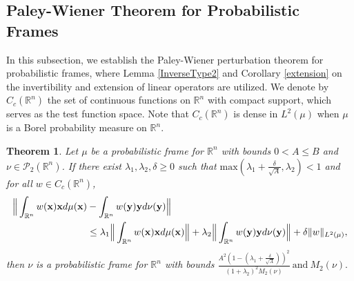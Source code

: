 \documentclass{amsart}
\numberwithin{equation}{section}
\theoremstyle{plain}
\newtheorem{theorem}{Theorem}[section]
\theoremstyle{definition}
\begin{document}
\subsection{Paley-Wiener Theorem for Probabilistic Frames}\label{PaleyWiener}
In this subsection, we establish the Paley-Wiener perturbation theorem for probabilistic frames, where Lemma \ref{InverseType2} and Corollary \ref{extension} on the invertibility and extension of linear operators are utilized. We denote by $C_c(\mathbb{R}^n)$ the set of continuous functions on $\mathbb{R}^n$ with compact support, which serves as the test function space. Note that $C_c(\mathbb{R}^n)$ is dense in $L^2(\mu)$ when $\mu$ is a Borel probability measure on $\mathbb{R}^n$. 


\begin{theorem}\label{PaleyPFrame2}
Let $\mu$ be a probabilistic frame for $\mathbb{R}^n$ with bounds $0<A\leq B$ and $\nu \in \mathcal{P}_2(\mathbb{R}^n)$. If there exist  $\lambda_1,\lambda_2, \delta \geq 0$ such that $\mathrm{max} (\lambda_1 + \frac{\delta}{\sqrt{A}}, \lambda_2) <1$ and for all $w \in C_c(\mathbb{R}^n)$,
    \begin{equation*}
    \begin{split}
        \Big   \Vert \int_{\mathbb{R}^n} w({\bf x}){\bf x} d\mu({\bf x}) & - \int_{\mathbb{R}^n} w({\bf y}){\bf y} d\nu({\bf y}) \Big \Vert  \\
       &\leq \lambda_1 \Big \Vert \int_{\mathbb{R}^n} w({\bf x}){\bf x} d\mu({\bf x}) \Big \Vert + \lambda_2 \Big \Vert \int_{\mathbb{R}^n} w({\bf y}){\bf y} d\nu({\bf y}) \Big \Vert + \delta  \Vert  w \Vert_{L^2(\mu)}, 
    \end{split}
    \end{equation*}
then $\nu$ is a probabilistic frame for $\mathbb{R}^n$ with bounds 
$\frac{ A^2(1-(\lambda_1 + \frac{\delta}{\sqrt{A}}))^2}{(1+\lambda_2)^2 M_2(\nu)} \ \text{and} \ M_2(\nu).$
\end{theorem}
\end{document}
